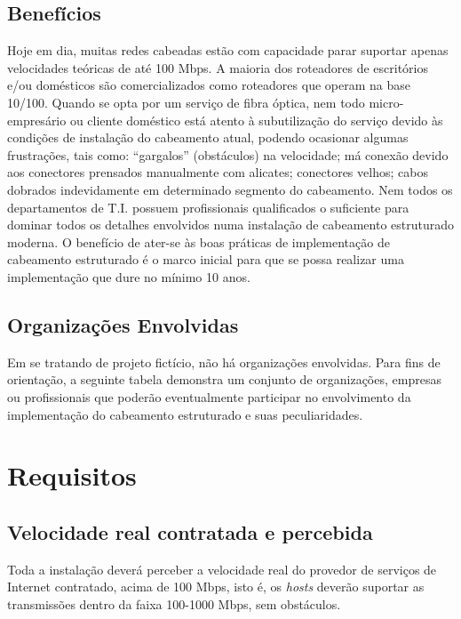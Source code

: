 \documentclass[	DIV=calc,%
							paper=a4,%
							fontsize=12pt,%
							onecolumn]{scrartcl}	 					%
\begin{document}
\subsection{Benefícios}
Hoje em dia, muitas redes cabeadas estão com capacidade parar suportar apenas velocidades teóricas de até 100 Mbps. A maioria dos roteadores de escritórios e/ou domésticos são comercializados como roteadores que operam na base 10/100. Quando se opta por um serviço de fibra óptica, nem todo micro-empresário ou cliente doméstico está atento à subutilização do serviço devido às condições de instalação do cabeamento atual, podendo ocasionar algumas frustrações, tais como: ``gargalos'' (obstáculos) na velocidade; má conexão devido aos conectores prensados manualmente com alicates; conectores velhos; cabos dobrados indevidamente em determinado segmento do cabeamento. Nem todos os departamentos de T.I. possuem profissionais qualificados o suficiente para dominar todos os detalhes envolvidos numa instalação de cabeamento estruturado moderna. O benefício de ater-se às boas práticas de implementação de cabeamento estruturado é o marco inicial para que se possa realizar uma implementação que dure no mínimo 10 anos.

\subsection{Organizações Envolvidas}
Em se tratando de projeto fictício, não há organizações envolvidas. Para fins de orientação, a seguinte tabela demonstra um conjunto de organizações, empresas ou profissionais que poderão eventualmente participar no envolvimento da implementação do cabeamento estruturado e suas peculiaridades.\\






\section{Requisitos}

\subsection{Velocidade real contratada e percebida}
Toda a instalação deverá perceber a velocidade real do provedor de serviços de Internet contratado, acima de 100 Mbps, isto é, os \textit{hosts} deverão suportar as transmissões dentro da faixa 100-1000 Mbps, sem obstáculos.
\end{document}
